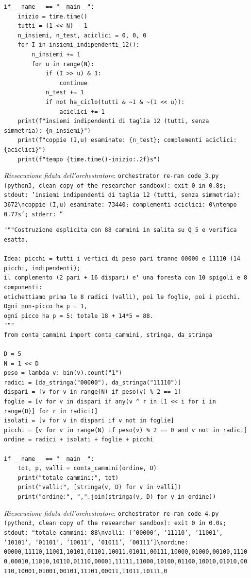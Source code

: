 \documentclass[11pt,a4paper]{article}
\begin{document}
\begin{lstlisting}[caption={attempt\_001 code\_3 [python, rigore exact] — Certificate 2 for the lower bound, independent method and no symmetry reduction: all indep — approvato dal Referee}]
if __name__ == "__main__":
    inizio = time.time()
    tutti = (1 << N) - 1
    n_insiemi, n_test, aciclici = 0, 0, 0
    for I in insiemi_indipendenti_12():
        n_insiemi += 1
        for u in range(N):
            if (I >> u) & 1:
                continue
            n_test += 1
            if not ha_ciclo(tutti & ~I & ~(1 << u)):
                aciclici += 1
    print(f"insiemi indipendenti di taglia 12 (tutti, senza simmetria): {n_insiemi}")
    print(f"coppie (I,u) esaminate: {n_test}; complementi aciclici: {aciclici}")
    print(f"tempo {time.time()-inizio:.2f}s")

\end{lstlisting}
\noindent\emph{Riesecuzione fidata dell'orchestratore}: \texttt{orchestrator re-ran code\_3.py (python3, clean copy of the researcher sandbox): exit 0 in 0.8s; stdout: 'insiemi indipendenti di taglia 12 (tutti, senza simmetria): 3672\textbackslash{}ncoppie (I,u) esaminate: 73440; complementi aciclici: 0\textbackslash{}ntempo 0.77s'; stderr: ''}
\begin{lstlisting}[caption={attempt\_001 code\_4 [python, rigore exact] — Builds the 88-path labelling (peaks = even vertices minus 00000, 11110) and counts exactly — approvato dal Referee}]
"""Costruzione esplicita con 88 cammini in salita su Q_5 e verifica esatta.

Idea: picchi = tutti i vertici di peso pari tranne 00000 e 11110 (14 picchi, indipendenti);
il complemento (2 pari + 16 dispari) e' una foresta con 10 spigoli e 8 componenti:
etichettiamo prima le 8 radici (valli), poi le foglie, poi i picchi. Ogni non-picco ha p = 1,
ogni picco ha p = 5: totale 18 + 14*5 = 88.
"""
from conta_cammini import conta_cammini, stringa, da_stringa

D = 5
N = 1 << D
peso = lambda v: bin(v).count("1")
radici = [da_stringa("00000"), da_stringa("11110")]
dispari = [v for v in range(N) if peso(v) % 2 == 1]
foglie = [v for v in dispari if any(v ^ r in [1 << i for i in range(D)] for r in radici)]
isolati = [v for v in dispari if v not in foglie]
picchi = [v for v in range(N) if peso(v) % 2 == 0 and v not in radici]
ordine = radici + isolati + foglie + picchi

if __name__ == "__main__":
    tot, p, valli = conta_cammini(ordine, D)
    print("totale cammini:", tot)
    print("valli:", [stringa(v, D) for v in valli])
    print("ordine:", ",".join(stringa(v, D) for v in ordine))

\end{lstlisting}
\noindent\emph{Riesecuzione fidata dell'orchestratore}: \texttt{orchestrator re-ran code\_4.py (python3, clean copy of the researcher sandbox): exit 0 in 0.0s; stdout: "totale cammini: 88\textbackslash{}nvalli: ['00000', '11110', '11001', '10101', '01101', '10011', '01011', '00111']\textbackslash{}nordine: 00000,11110,11001,10101,01101,10011,01011,00111,10000,01000,00100,11100,00010,11010,10110,01110,00001,11111,11000,10100,01100,10010,01010,00110,10001,01001,00101,11101,00011,11011,10111,0}
\end{document}

